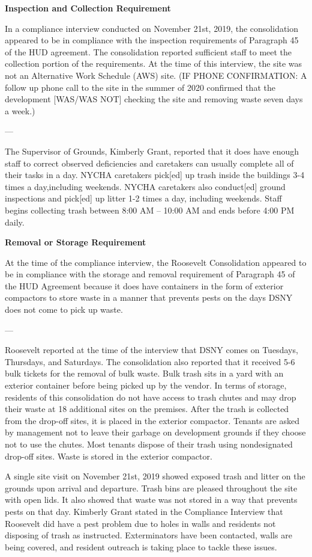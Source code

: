 
\textbf{Inspection and Collection Requirement}

In a compliance interview conducted on November 21st, 2019, the consolidation appeared to be in compliance with the inspection requirements of Paragraph 45 of the HUD agreement. The consolidation reported sufficient staff to meet the collection portion of the requirements. At the time of this interview, the site was not an Alternative Work Schedule (AWS) site. (IF PHONE CONFIRMATION: A follow up phone call to the site in the summer of 2020 confirmed that the development [WAS/WAS NOT] checking the site and removing waste seven days a week.)

---

The Supervisor of Grounds, Kimberly Grant, reported that it does have enough staff to correct observed deficiencies and caretakers can usually complete all of their tasks in a day. NYCHA caretakers pick[ed] up trash inside the buildings 3-4 times a day,including weekends. NYCHA caretakers also conduct[ed] ground inspections and pick[ed] up litter 1-2 times a day, including weekends. Staff begins collecting trash between 8:00 AM -- 10:00 AM and ends before 4:00 PM daily. 

\textbf{Removal or Storage Requirement}

At the time of the compliance interview, the Roosevelt Consolidation appeared to be in compliance with the storage and removal requirement of Paragraph 45 of the HUD Agreement because it does have containers in the form of exterior compactors to store waste in a manner that prevents pests on the days DSNY does not come to pick up waste.

---

Roosevelt reported at the time of the interview that DSNY comes on Tuesdays, Thursdays, and Saturdays. The consolidation also reported that it received 5-6 bulk tickets for the removal of bulk waste. Bulk trash sits in a yard with an exterior container before being picked up by the vendor. In terms of storage, residents of this consolidation do not have access to trash chutes and may drop their waste at 18 additional sites on the premises. After the trash is collected from the drop-off sites, it is placed in the exterior compactor. Tenants are asked by management not to leave their garbage on development grounds if they choose not to use the chutes. Most tenants dispose of their trash using nondesignated drop-off sites. Waste is stored in the exterior compactor.  

A single site visit on November 21st, 2019 showed exposed trash and litter on the grounds upon arrival and departure. Trash bins are pleased throughout the site with open lids. It also showed that waste was not stored in a way that prevents pests on that day. Kimberly Grant stated in the Compliance Interview that Roosevelt did have a pest problem due to holes in walls and residents not disposing of trash as instructed. Exterminators have been contacted, walls are being covered, and resident outreach is taking place to tackle these issues.

